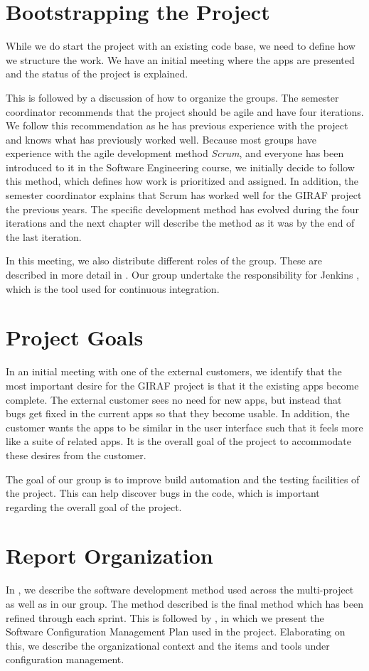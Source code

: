 \section{Bootstrapping the Project}
While we do start the project with an existing code base, we need to define how we structure the work. We have an initial meeting where the apps are presented and the status of the project is explained.

This is followed by a discussion of how to organize the groups. The semester coordinator recommends that the project should be agile and have four iterations. We follow this recommendation as he has previous experience with the project and knows what has previously worked well. Because most groups have experience with the agile development method \emph{Scrum}, and everyone has been introduced to it in the Software Engineering course, we initially decide to follow this method, which defines how work is prioritized and assigned. In addition, the semester coordinator explains that Scrum has worked well for the GIRAF project the previous years. The specific development method has evolved during the four iterations and the next chapter will describe the method as it was by the end of the last iteration.

In this meeting, we also distribute different roles of the group. These are described in more detail in . Our group undertake the responsibility for Jenkins \cite{JenkinsWebsite}, which is the tool used for continuous integration.

\section{Project Goals}
In an initial meeting with one of the external customers, we identify that the most important desire for the GIRAF project is that it the existing apps become complete. The external customer sees no need for new apps, but instead that bugs get fixed in the current apps so that they become usable. In addition, the customer wants the apps to be similar in the user interface such that it feels more like a suite of related apps. It is the overall goal of the project to accommodate these desires from the customer.

The goal of our group is to improve build automation and the testing facilities of the project. This can help discover bugs in the code, which is important regarding the overall goal of the project.

\section{Report Organization}
In , we describe the software development method used across the multi-project as well as in our group. The method described is the final method which has been refined through each sprint. This is followed by , in which we present the Software Configuration Management Plan used in the project. Elaborating on this, we describe the organizational context and the items and tools under configuration management.


